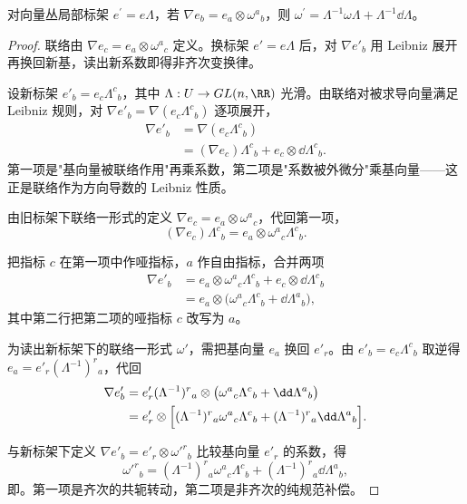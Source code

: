 \begin{proposition}[联络的换标架律]
对向量丛局部标架 $e^\prime=e\Lambda$，若 $\nabla e_b=e_a\otimes\omega^a{}_b$，则 $\omega^\prime=\Lambda^{-1}\omega\Lambda+\Lambda^{-1}\dd\Lambda$。
\end{proposition}
\begin{proof}
联络由 $\nabla e_c=e_a\otimes\omega^a{}_c$ 定义。换标架 $e'=e\Lambda$ 后，对 $\nabla e'_b$ 用 Leibniz 展开再换回新基，读出新系数即得非齐次变换律。

设新标架 $e'_b=e_c\Lambda^c{}_b$，其中 $\Lambda:U\to GL(n,\RR)$ 光滑。由联络对被求导向量满足 Leibniz 规则，对 $\nabla e'_b=\nabla(e_c\Lambda^c{}_b)$ 逐项展开，
\begin{align*}
\nabla e'_b
&=\nabla(e_c\Lambda^c{}_b)\\
&=(\nabla e_c)\Lambda^c{}_b+e_c\otimes\dd\Lambda^c{}_b.
\end{align*}
第一项是"基向量被联络作用"再乘系数，第二项是"系数被外微分"乘基向量——这正是联络作为方向导数的 Leibniz 性质。

由旧标架下联络一形式的定义 $\nabla e_c=e_a\otimes\omega^a{}_c$，代回第一项，
\begin{equation*}
(\nabla e_c)\Lambda^c{}_b
=e_a\otimes\omega^a{}_c\Lambda^c{}_b.
\end{equation*}

把指标 $c$ 在第一项中作哑指标，$a$ 作自由指标，合并两项
\begin{align*}
\nabla e'_b
&=e_a\otimes\omega^a{}_c\Lambda^c{}_b
 +e_c\otimes\dd\Lambda^c{}_b\\
&=e_a\otimes\bigl(\omega^a{}_c\Lambda^c{}_b+\dd\Lambda^a{}_b\bigr),
\end{align*}
其中第二行把第二项的哑指标 $c$ 改写为 $a$。

为读出新标架下的联络一形式 $\omega'$，需把基向量 $e_a$ 换回 $e'_r$。由 $e'_b=e_c\Lambda^c{}_b$ 取逆得 $e_a=e'_r(\Lambda^{-1})^r{}_a$，代回
\begin{align*}
\nabla e'_b
&=e'_r(\Lambda^{-1})^r{}_a\otimes
 \bigl(\omega^a{}_c\Lambda^c{}_b+\dd\Lambda^a{}_b\bigr)\\
&=e'_r\otimes
 \Bigl[
  (\Lambda^{-1})^r{}_a\omega^a{}_c\Lambda^c{}_b
  +(\Lambda^{-1})^r{}_a\dd\Lambda^a{}_b
 \Bigr].
\end{align*}

与新标架下定义 $\nabla e'_b=e'_r\otimes\omega'^r{}_b$ 比较基向量 $e'_r$ 的系数，得
\begin{equation*}
\omega'^r{}_b
=(\Lambda^{-1})^r{}_a\omega^a{}_c\Lambda^c{}_b
+(\Lambda^{-1})^r{}_a\dd\Lambda^a{}_b,
\end{equation*}
即。第一项是齐次的共轭转动，第二项是非齐次的纯规范补偿。


\end{proof}
